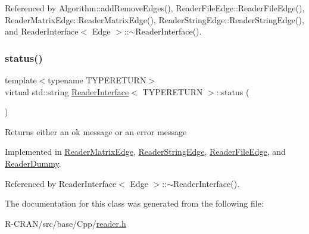 Referenced by Algorithm\+::add\+Remove\+Edges(), Reader\+File\+Edge\+::\+Reader\+File\+Edge(), Reader\+Matrix\+Edge\+::\+Reader\+Matrix\+Edge(), Reader\+String\+Edge\+::\+Reader\+String\+Edge(), and Reader\+Interface$<$ Edge $>$\+::$\sim$\+Reader\+Interface().

\mbox{\label{classReaderInterface_a5f86ed49eac808ed0a912f7d670c4042}} 
\subsubsection{\texorpdfstring{status()}{status()}}
{\footnotesize\ttfamily template$<$typename T\+Y\+P\+E\+R\+E\+T\+U\+RN$>$ \\
virtual std\+::string \hyperlink{classReaderInterface}{Reader\+Interface}$<$ T\+Y\+P\+E\+R\+E\+T\+U\+RN $>$\+::status (\begin{DoxyParamCaption}{ }\end{DoxyParamCaption})\hspace{0.3cm}{\ttfamily [pure virtual]}}

\begin{DoxyReturn}{Returns}
either an ok message or an error message 
\end{DoxyReturn}


Implemented in \hyperlink{classReaderMatrixEdge_a14cfd06f703e6a24d007514e5dee24ff}{Reader\+Matrix\+Edge}, \hyperlink{classReaderStringEdge_a11fe073e85d07a48d0f0549b51af36b6}{Reader\+String\+Edge}, \hyperlink{classReaderFileEdge_a05205d129f4f59c5cbd4e7a2dcb3d0c1}{Reader\+File\+Edge}, and \hyperlink{classReaderDummy_a7d7fc03e8d3427c6c63262f2ff53ec84}{Reader\+Dummy}.



Referenced by Reader\+Interface$<$ Edge $>$\+::$\sim$\+Reader\+Interface().



The documentation for this class was generated from the following file\+:\begin{DoxyCompactItemize}
\item 
R-\/\+C\+R\+A\+N/src/base/\+Cpp/\hyperlink{reader_8h}{reader.\+h}\end{DoxyCompactItemize}
